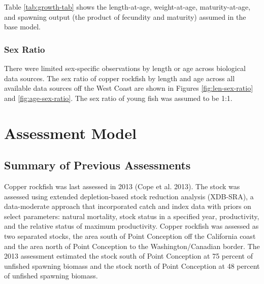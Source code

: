 \documentclass[11pt,
  english,
  a4paper,
]{article}
\begin{document}

Table \ref{tab:growth-tab} shows the length-at-age, weight-at-age, maturity-at-age, and spawning output (the product of fecundity and maturity) assumed in the base model.

\leavevmode\tagmcend\tagstructend\par


\hypertarget{sex-ratio}{%
\subsubsection{Sex Ratio}\label{sex-ratio}}

\leavevmode\tagmcend\tagstructend


There were limited sex-specific observations by length or age across biological data sources. The sex ratio of copper rockfish by length and age across all available data sources off the West Coast are shown in Figures \ref{fig:len-sex-ratio} and \ref{fig:age-sex-ratio}. The sex ratio of young fish was assumed to be 1:1.

\leavevmode\tagmcend\tagstructend\par


\hypertarget{assessment-model}{%
\section{Assessment Model}\label{assessment-model}}

\leavevmode\tagmcend\tagstructend


\hypertarget{summary-of-previous-assessments}{%
\subsection{Summary of Previous Assessments}\label{summary-of-previous-assessments}}

\leavevmode\tagmcend\tagstructend


Copper rockfish was last assessed in 2013 {(Cope et al. 2013)\leavevmode\tagmcend\tagstructend}. The stock was assessed using extended depletion-based stock reduction analysis (XDB-SRA), a data-moderate approach that incorporated catch and index data with priors on select parameters: natural mortality, stock status in a specified year, productivity, and the relative status of maximum productivity. Copper rockfish was assessed as two separated stocks, the area south of Point Conception off the California coast and the area north of Point Conception to the Washington/Canadian border. The 2013 assessment estimated the stock south of Point Conception at 75 percent of unfished spawning biomass and the stock north of Point Conception at 48 percent of unfished spawning biomass.
\end{document}
